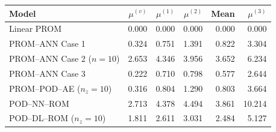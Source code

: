 \begin{tabular}{lrrrrr}
\toprule
Model & $\mu^{(v)}$ & $\mu^{(1)}$ & $\mu^{(2)}$ & Mean & $\mu^{(3)}$ \\
\midrule
Linear PROM & 0.000 & 0.000 & 0.000 & 0.000 & 0.000 \\
PROM--ANN Case 1 & 0.324 & 0.751 & 1.391 & 0.822 & 3.304 \\
PROM--ANN Case 2 ($n=10$) & 2.653 & 4.346 & 3.956 & 3.652 & 6.234 \\
PROM--ANN Case 3 & 0.222 & 0.710 & 0.798 & 0.577 & 2.644 \\
PROM--POD--AE ($n_z=10$) & 0.316 & 0.804 & 1.290 & 0.803 & 3.664 \\
\midrule
POD--NN--ROM & 2.713 & 4.378 & 4.494 & 3.861 & 10.214 \\
POD--DL--ROM ($n_z=10$) & 1.811 & 2.611 & 3.031 & 2.484 & 5.127 \\
\bottomrule
\end{tabular}

